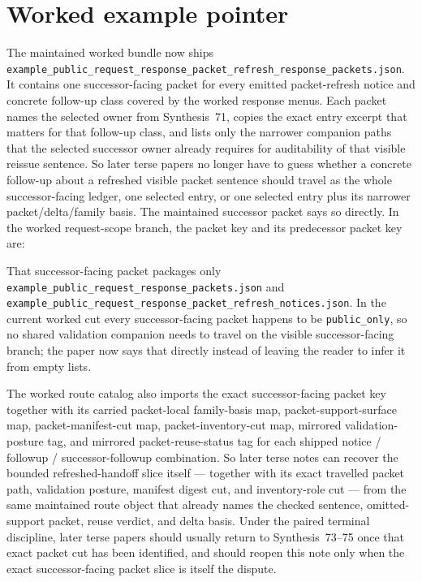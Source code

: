 \documentclass[11pt]{article}
\begin{document}
\section{Worked example pointer}
The maintained worked bundle now ships \nolinkurl{example_public_request_response_packet_refresh_response_packets.json}.\cite{series:workedexample}
It contains one successor-facing packet for every emitted packet-refresh notice and concrete follow-up class covered by the worked response menus.
Each packet names the selected owner from Synthesis~71, copies the exact entry excerpt that matters for that follow-up class, and lists only the narrower companion paths that the selected successor owner already requires for auditability of that visible reissue sentence.
So later terse papers no longer have to guess whether a concrete follow-up about a refreshed visible packet sentence should travel as the whole successor-facing ledger, one selected entry, or one selected entry plus its narrower packet/delta/family basis.
The maintained successor packet says so directly. In the worked request-scope branch, the packet key and its predecessor packet key are:
\begin{quote}\small
{}

\end{quote}
That successor-facing packet packages only \nolinkurl{example_public_request_response_packets.json} and \nolinkurl{example_public_request_response_packet_refresh_notices.json}. In the current worked cut every successor-facing packet happens to be \texttt{public\_only}, so no shared validation companion needs to travel on the visible successor-facing branch; the paper now says that directly instead of leaving the reader to infer it from empty lists.

The worked route catalog also imports the exact successor-facing packet key together with its carried packet-local family-basis map, packet-support-surface map, packet-manifest-cut map, packet-inventory-cut map, mirrored validation-posture tag, and mirrored packet-reuse-status tag for each shipped notice / followup / successor-followup combination. So later terse notes can recover the bounded refreshed-handoff slice itself --- together with its exact travelled packet path, validation posture, manifest digest cut, and inventory-role cut --- from the same maintained route object that already names the checked sentence, omitted-support packet, reuse verdict, and delta basis. Under the paired terminal discipline, later terse papers should usually return to Synthesis~73--75 once that exact packet cut has been identified, and should reopen this note only when the exact successor-facing packet slice is itself the dispute.\cite{series:pairedterminalcitationdiscipline,series:pairedterminalcutoverrules}
\end{document}
